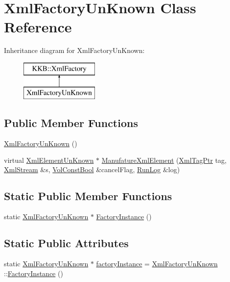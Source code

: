 \hypertarget{class_xml_factory_un_known}{}\section{Xml\+Factory\+Un\+Known Class Reference}
\label{class_xml_factory_un_known}
Inheritance diagram for Xml\+Factory\+Un\+Known\+:\begin{figure}[H]
\begin{center}
\leavevmode
\includegraphics[height=2.000000cm]{class_xml_factory_un_known}
\end{center}
\end{figure}
\subsection*{Public Member Functions}
\begin{DoxyCompactItemize}
\item 
\hyperlink{class_xml_factory_un_known_ab81b06ab2ad59caaefb90981e0b89c91}{Xml\+Factory\+Un\+Known} ()
\item 
virtual \hyperlink{class_k_k_b_1_1_xml_element_un_known}{Xml\+Element\+Un\+Known} $\ast$ \hyperlink{class_xml_factory_un_known_aafefd9c9ec5a895cb389aa11318eb25e}{Manufature\+Xml\+Element} (\hyperlink{namespace_k_k_b_a9253a3ea8a5da18ca82be4ca2b390ef0}{Xml\+Tag\+Ptr} tag, \hyperlink{class_k_k_b_1_1_xml_stream}{Xml\+Stream} \&s, \hyperlink{namespace_k_k_b_a7d390f568e2831fb76b86b56c87bf92f}{Vol\+Const\+Bool} \&cancel\+Flag, \hyperlink{class_k_k_b_1_1_run_log}{Run\+Log} \&log)
\end{DoxyCompactItemize}
\subsection*{Static Public Member Functions}
\begin{DoxyCompactItemize}
\item 
static \hyperlink{class_xml_factory_un_known}{Xml\+Factory\+Un\+Known} $\ast$ \hyperlink{class_xml_factory_un_known_a5c66e2c26195cea8a10093e1b58189eb}{Factory\+Instance} ()
\end{DoxyCompactItemize}
\subsection*{Static Public Attributes}
\begin{DoxyCompactItemize}
\item 
static \hyperlink{class_xml_factory_un_known}{Xml\+Factory\+Un\+Known} $\ast$ \hyperlink{class_xml_factory_un_known_ab2052354f465f0e25758d8b881a30785}{factory\+Instance} = \hyperlink{class_xml_factory_un_known}{Xml\+Factory\+Un\+Known} \+::\hyperlink{class_xml_factory_un_known_a5c66e2c26195cea8a10093e1b58189eb}{Factory\+Instance} ()
\end{DoxyCompactItemize}


